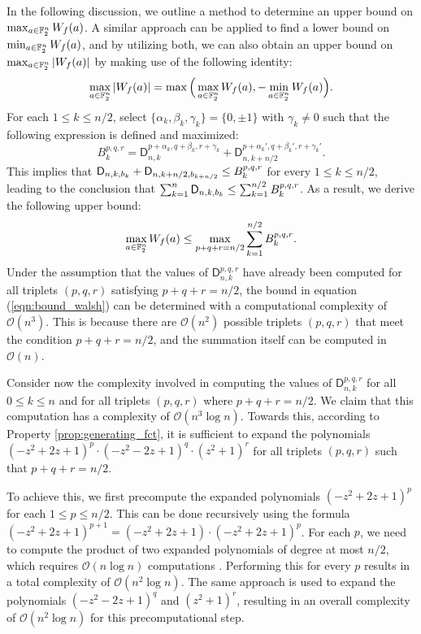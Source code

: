 \documentclass[11pt]{llncs}
\begin{document}
In the following discussion, we outline a method to determine an upper bound on $\max_{a\in\mathbb{F}_2^n}W_{f}(a)$. A similar approach can be applied to find a lower bound on $\min_{a\in\mathbb{F}_2^n}W_{f}(a)$, and by utilizing both, we can also obtain an upper bound on $\max_{a\in\mathbb{F}_2^n}|W_{f}(a)|$ by making use of the following identity:
\[
    \max_{a\in\mathbb{F}_2^n}|W_{f}(a)|=\max\Big(\max_{a\in\mathbb{F}_2^n}W_{f}(a),-\min_{a\in\mathbb{F}_2^n}W_{f}(a)\Big).
\]
For each $1\leq k\leq n/2$, select $\{\alpha_k,\beta_k,\gamma_k\}=\{0,\pm 1\}$ with $\gamma_k\neq 0$ such that the following expression is defined and maximized:
\[
    B_k^{p,q,r}=\mathsf D_{n,k}^{p+\alpha_k,q+\beta_k,r+\gamma_k}+\mathsf D_{n,k+n/2}^{p+\alpha_k',q+\beta_k',r+\gamma_k'}.
\]
This implies that $\mathsf{D}_{n,k,b_k}+\mathsf{D}_{n,k+n/2,b_{k+n/2}}\leq B_k^{p,q,r}$ for every $1\leq k\leq n/2$, leading to the conclusion that $\sum_{k=1}^n\mathsf{D}_{n,k,b_k}\leq\sum_{k=1}^{n/2} B_k^{p,q,r}$. As a result, we derive the following upper bound:
\begin{equation}\label{eqn:bound_walsh}
\max_{a\in\mathbb{F}_2^n}W_{f}(a)\leq\max_{p+q+r=n/2}\sum_{k=1}^{n/2} B_k^{p,q,r}.
\end{equation}
Under the assumption that the values of $\mathsf{D}_{n,k}^{p,q,r}$ have already been computed for all triplets $(p,q,r)$ satisfying $p+q+r=n/2$, the bound in equation (\ref{eqn:bound_walsh}) can be determined with a computational complexity of $\mathcal{O}(n^3)$. This is because there are $\mathcal{O}(n^2)$ possible triplets $(p,q,r)$ that meet the condition $p+q+r=n/2$, and the summation itself can be computed in $\mathcal{O}(n)$.

Consider now the complexity involved in computing the values of $\mathsf{D}_{n,k}^{p,q,r}$ for all $0 \leq k \leq n$ and for all triplets $(p,q,r)$ where $p+q+r=n/2$. We claim that this computation has a complexity of $\mathcal{O}(n^3 \log n)$. Towards this, according to Property \ref{prop:generating_fct}, it is sufficient to expand the polynomials $(-z^2 + 2z + 1)^p \cdot (-z^2 - 2z + 1)^q \cdot (z^2 + 1)^r$ for all triplets $(p,q,r)$ such that $p+q+r=n/2$.

To achieve this, we first precompute the expanded polynomials $(-z^2 + 2z + 1)^p$ for each $1 \leq p \leq n/2$. This can be done recursively using the formula $(-z^2 + 2z + 1)^{p+1} = (-z^2 + 2z + 1) \cdot (-z^2 + 2z + 1)^p$. For each $p$, we need to compute the product of two expanded polynomials of degree at most $n/2$, which requires $\mathcal{O}(n \log n)$ computations . Performing this for every $p$ results in a total complexity of $\mathcal{O}(n^2 \log n)$. The same approach is used to expand the polynomials $(-z^2 - 2z + 1)^q$ and $(z^2 + 1)^r$, resulting in an overall complexity of $\mathcal{O}(n^2 \log n)$ for this precomputational step.
\end{document}

